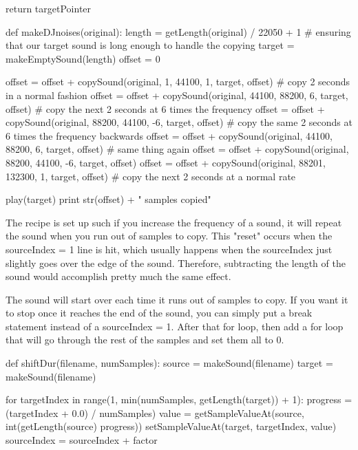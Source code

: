 \begin{exercises}
\begin{ex}
\begin{example}
  return targetPointer

def makeDJnoises(original):
  length = getLength(original) / 22050 + 1 # ensuring that our target sound
is long enough to handle the copying
  target = makeEmptySound(length)
  offset = 0

  offset = offset + copySound(original, 1, 44100, 1, target, offset) # copy
2 seconds in a normal fashion
  offset = offset + copySound(original, 44100, 88200, 6, target, offset) #
copy the next 2 seconds at 6 times the frequency
  offset = offset + copySound(original, 88200, 44100, -6, target, offset) #
copy the same 2 seconds at 6 times the frequency backwards
  offset = offset + copySound(original, 44100, 88200, 6, target, offset) #
same thing again
  offset = offset + copySound(original, 88200, 44100, -6, target, offset)
  offset = offset + copySound(original, 88201, 132300, 1, target, offset) #
copy the next 2 seconds at a normal rate

  play(target)
  print str(offset) + " samples copied"
\end{example}
\end{ex}

\begin{ex}
The recipe is set up such if you increase the frequency of a sound, it will
repeat the sound when you run out of samples to copy. This "reset" occurs
when the sourceIndex = 1 line is hit, which usually happens when the
sourceIndex just slightly goes over the edge of the sound. Therefore,
subtracting the length of the sound would accomplish pretty much the same
effect.

The sound will start over each time it runs out of samples to copy. If you
want it to stop once it reaches the end of the sound, you can simply put a
break statement instead of a sourceIndex = 1. After that for loop, then add
a for loop that will go through the rest of the samples and set them all to
0.
\end{ex}

\begin{ex}
\begin{example}
def shiftDur(filename, numSamples):
  source = makeSound(filename)
  target = makeSound(filename)
  
  for targetIndex in range(1, min(numSamples, getLength(target)) + 1):
    progress = (targetIndex + 0.0) / numSamples)
    value = getSampleValueAt(source, int(getLength(source)  progress))
    setSampleValueAt(target, targetIndex, value)
    sourceIndex = sourceIndex + factor


\end{example}
\end{ex}
\end{exercises}
